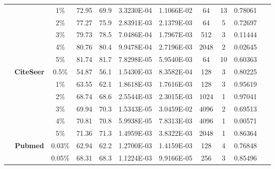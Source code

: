 \begin{table}[htbp]
\begin{tabular}{ccccc|cccccc}
          &       & 1\%   & \cellcolor[rgb]{ .388,  .745,  .482}72.95 & \cellcolor[rgb]{ .973,  .412,  .42}69.9 & 3.3230E-04 & 1.1066E-02 & 64    & 13    & 0.78061 & ~ \\
          &       & 2\%   & \cellcolor[rgb]{ .388,  .745,  .482}77.27 & \cellcolor[rgb]{ .973,  .412,  .42}75.9 & 2.8391E-03 & 2.1379E-03 & 64    & 5     & 0.72697 & ~ \\
          &       & 3\%   & \cellcolor[rgb]{ .388,  .745,  .482}79.73 & \cellcolor[rgb]{ .973,  .412,  .42}78.5 & 7.0486E-04 & 1.7967E-03 & 512   & 3     & 0.11444 & ~ \\
          &       & 4\%   & \cellcolor[rgb]{ .388,  .745,  .482}80.76 & \cellcolor[rgb]{ .973,  .412,  .42}80.4 & 9.9478E-04 & 2.7196E-03 & 2048  & 2     & 0.02645 & ~ \\
          &       & 5\%   & \cellcolor[rgb]{ .388,  .745,  .482}81.74 & \cellcolor[rgb]{ .973,  .412,  .42}81.7 & 7.8298E-05 & 5.9540E-03 & 64    & 10    & 0.60363 & ~ \\
          & \multirow{6}[0]{*}{\textbf{CiteSeer}} & 0.5\% & \cellcolor[rgb]{ .973,  .412,  .42}54.87 & \cellcolor[rgb]{ .388,  .745,  .482}56.1 & 1.5430E-03 & 8.3582E-04 & 128   & 3     & 0.80225 & ~ \\
          &       & 1\%   & \cellcolor[rgb]{ .388,  .745,  .482}63.55 & \cellcolor[rgb]{ .973,  .412,  .42}62.1 & 1.8618E-03 & 1.7616E-03 & 128   & 3     & 0.95619 & ~ \\
          &       & 2\%   & \cellcolor[rgb]{ .388,  .745,  .482}68.74 & \cellcolor[rgb]{ .973,  .412,  .42}68.6 & 2.5544E-03 & 2.3015E-03 & 1024  & 1     & 0.97041 & ~ \\
          &       & 3\%   & \cellcolor[rgb]{ .973,  .412,  .42}69.94 & \cellcolor[rgb]{ .388,  .745,  .482}70.3 & 1.5343E-05 & 3.0459E-02 & 4096  & 2     & 0.69513 & ~ \\
          &       & 4\%   & \cellcolor[rgb]{ .388,  .745,  .482}70.81 & \cellcolor[rgb]{ .973,  .412,  .42}70.8 & 5.9938E-05 & 7.8313E-03 & 4096  & 1     & 0.00571 & ~ \\
          &       & 5\%   & \cellcolor[rgb]{ .388,  .745,  .482}71.36 & \cellcolor[rgb]{ .973,  .412,  .42}71.3 & 1.4959E-03 & 3.8322E-03 & 2048  & 1     & 0.86364 & ~ \\
          & \multirow{4}[1]{*}{\textbf{Pubmed}} & 0.03\% & \cellcolor[rgb]{ .388,  .745,  .482}62.94 & \cellcolor[rgb]{ .973,  .412,  .42}62.2 & 1.2700E-03 & 1.4159E-03 & 128   & 4     & 0.76848 & ~ \\
          &       & 0.05\% & \cellcolor[rgb]{ .388,  .745,  .482}68.31 & \cellcolor[rgb]{ .973,  .412,  .42}68.3 & 1.1224E-03 & 9.9166E-05 & 256   & 3     & 0.85496 & ~ \\

\end{tabular}
\end{table}

